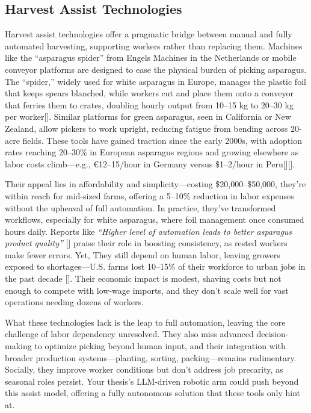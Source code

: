 \subsection{Harvest Assist Technologies}
Harvest assist technologies offer a pragmatic bridge between manual and fully automated harvesting, supporting workers rather than replacing them. Machines like the ``asparagus spider'' from Engels Machines in the Netherlands or mobile conveyor platforms are designed to ease the physical burden of picking asparagus. The ``spider,'' widely used for white asparagus in Europe, manages the plastic foil that keeps spears blanched, while workers cut and place them onto a conveyor that ferries them to crates, doubling hourly output from 10--15 kg to 20--30 kg per worker[\cite{freshplaza2019automation}]. Similar platforms for green asparagus, seen in California or New Zealand, allow pickers to work upright, reducing fatigue from bending across 20-acre fields. These tools have gained traction since the early 2000s, with adoption rates reaching 20--30\% in European asparagus regions and growing elsewhere as labor costs climb—e.g., €12--15/hour in Germany versus \$1--2/hour in Peru[\cite{freshplaza2018engels}][\cite{engelsmachines2020about}].

Their appeal lies in affordability and simplicity—costing \$20,000--\$50,000, they’re within reach for mid-sized farms, offering a 5--10\% reduction in labor expenses without the upheaval of full automation. In practice, they’ve transformed workflows, especially for white asparagus, where foil management once consumed hours daily. Reports like \textit{“Higher level of automation leads to better asparagus product quality”} [\cite{freshplaza2019automation}] praise their role in boosting consistency, as rested workers make fewer errors. Yet, They still depend on human labor, leaving growers exposed to shortages—U.S. farms lost 10--15\% of their workforce to urban jobs in the past decade [\cite{usda2022labor}]. Their economic impact is modest, shaving costs but not enough to compete with low-wage imports, and they don’t scale well for vast operations needing dozens of workers.

What these technologies lack is the leap to full automation, leaving the core challenge of labor dependency unresolved. They also miss advanced decision-making to optimize picking beyond human input, and their integration with broader production systems—planting, sorting, packing—remains rudimentary. Socially, they improve worker conditions but don’t address job precarity, as seasonal roles persist. Your thesis’s LLM-driven robotic arm could push beyond this assist model, offering a fully autonomous solution that these tools only hint at.

